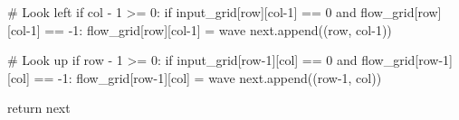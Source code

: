\documentclass[11pt,a4paper,boxed]{caspset}
\begin{document}
\begin{subappendices}
\begin{python}
        # Look left
        if col - 1 >= 0:
            if input_grid[row][col-1] == 0 and flow_grid[row][col-1] == -1:
                flow_grid[row][col-1] = wave
                next.append((row, col-1))

        # Look up
        if row - 1 >= 0:
            if input_grid[row-1][col] == 0 and flow_grid[row-1][col] == -1:
                flow_grid[row-1][col] = wave
                next.append((row-1, col))

    return next
\end{python}
\end{subappendices}
\end{document}
